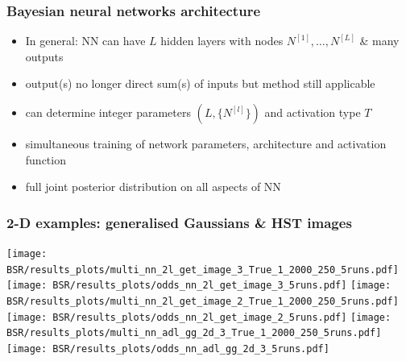 \documentclass[%
    9pt,
]{beamer}
\newcommand{\red}[1]{\textcolor{cambblue}{#1}}
\begin{document}
\begin{frame}
\frametitle{Bayesian neural networks architecture}

\begin{itemize}

\item \red{In general}: NN can have $L$ \red{hidden layers} with
\red{nodes} $N^{[1]},\ldots,N^{[L]}$ \& many \red{outputs}
\item output(s) no longer \red{direct sum(s)} of inputs but \red{method
still applicable}
\item can \red{determine integer parameters}
$(L,\{N^{[l]}\})$ and \red{activation type} $T$
\item \red{simultaneous} training of network \red{parameters},
\red{architecture} and \red{activation function}
\item \red{full joint posterior} distribution on \red{all
aspects} of NN

\end{itemize}

\end{frame}

\begin{frame}
    \frametitle{2-D examples: generalised Gaussians \& HST images}

\texttt{[image: BSR/results\_plots/multi\_nn\_2l\_get\_image\_3\_True\_1\_2000\_250\_5runs.pdf]}\qquad 
\texttt{[image: BSR/results\_plots/odds\_nn\_2l\_get\_image\_3\_5runs.pdf]}                        
\texttt{[image: BSR/results\_plots/multi\_nn\_2l\_get\_image\_2\_True\_1\_2000\_250\_5runs.pdf]}\qquad 
\texttt{[image: BSR/results\_plots/odds\_nn\_2l\_get\_image\_2\_5runs.pdf]}                        
\texttt{[image: BSR/results\_plots/multi\_nn\_adl\_gg\_2d\_3\_True\_1\_2000\_250\_5runs.pdf]} 
\texttt{[image: BSR/results\_plots/odds\_nn\_adl\_gg\_2d\_3\_5runs.pdf]} 
\end{frame}
\end{document}
